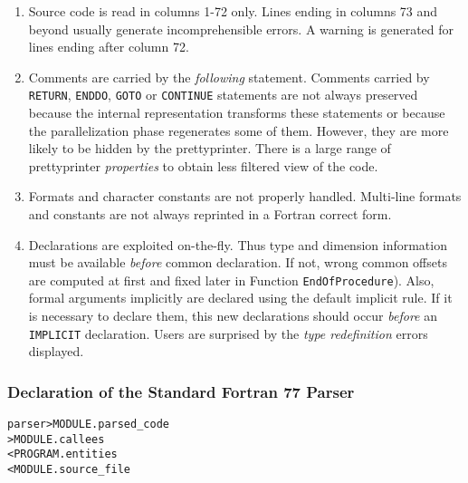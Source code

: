\documentclass[a4paper]{report}
\newenvironment{PipsMake}{\begin{alltt}}{\end{alltt}}
\newcommand{\PROPERTIES}{{\em properties}}
\begin{document}
\begin{enumerate}

  \item Source code is read in columns 1-72 only. Lines ending in columns
73 and beyond usually generate incomprehensible errors. A warning is
generated for lines ending after column 72.

\item Comments are carried by the {\em following} statement. Comments
  carried by \texttt{RETURN}, \texttt{ENDDO}, \texttt{GOTO} or
  \texttt{CONTINUE} statements are not always preserved because the
  internal representation transforms these statements or because the
  parallelization phase regenerates some of them. However, they are
  more likely to be hidden by the prettyprinter.  There is a large
  range of prettyprinter \PROPERTIES{} to obtain less filtered view of
  the code.

\item Formats and character constants are not properly handled. Multi-line
  formats and constants are not always reprinted in a Fortran correct
  form.

\item Declarations are exploited on-the-fly. Thus type and dimension
  information must be available {\em before} common declaration. If not,
  wrong common offsets are computed at first and fixed
  later in Function \texttt{EndOfProcedure}). Also, formal arguments
  implicitly are declared using the default implicit rule. If it is
  necessary to declare them, this new declarations should occur {\em
    before} an \texttt{IMPLICIT} declaration. Users are surprised by the
  {\em type redefinition} errors displayed.


\end{enumerate}


\subsubsection{Declaration of the Standard Fortran 77 Parser}
\label{subsubsection:declaration-of-the-standard-parser}

\begin{PipsMake}
parser                          > MODULE.parsed_code
                                > MODULE.callees
        < PROGRAM.entities
        < MODULE.source_file
\end{PipsMake}
\end{document}
